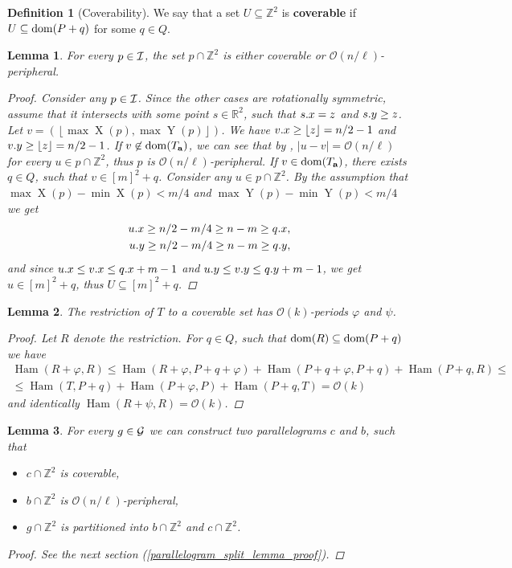 \documentclass[11pt, letterpaper]{article}
\theoremstyle{plain}
\newtheorem{lemma}{Lemma}
\theoremstyle{definition}
\newtheorem{definition}{Definition}
\theoremstyle{remark}
\newcommand{\R}{\mathbb{R}}
\newcommand{\Z}{\mathbb{Z}}
\renewcommand{\O}{\mathcal{O}}
\renewcommand{\phi}{\varphi}
\newcommand{\floor}[1]{\left\lfloor #1 \right\rfloor}
\newcommand{\eq}[1]{\begin{align*} #1 \end{align*}}
\DeclareMathOperator*{\X}{X}
\DeclareMathOperator*{\Y}{Y}
\DeclareMathOperator*{\Ham}{Ham}
\begin{document}
\begin{definition}[Coverability]
	We say that a set $U \subseteq \Z^2$ is \textbf{coverable} if $U \subseteq \operatorname*{dom}(P + q)$ for some $q \in Q$.
\end{definition}

\begin{lemma}\label{I_division}
	For every $p \in \mathcal{I}$, the set $p \cap \Z^2$ is either coverable or $\O(n / \ell)$-peripheral.
	\begin{proof}
		Consider any $p \in \mathcal{I}$.
		Since the other cases are rotationally symmetric, assume that it intersects with some point $s \in \R^2$, such that $s.x = z$ and $s.y \ge z$.
		Let $v = (\floor{\max \X(p), \max \Y(p)})$.
		We have $\x{v} \ge \floor{z} = n / 2 - 1$ and $\y{v} \ge \floor{z} = n / 2 - 1$.
		If $v \not \in \operatorname*{dom}(T_\mathbf{a})$, we can see that by ,
		$|u - v| = \O(n / \ell)$ for every $u \in p \cap \Z^2$, thus $p$ is $\O(n / \ell)$-peripheral.
		If $v \in \operatorname*{dom}(T_\mathbf{a})$, there exists $q \in Q$, such that $v \in [m]^2 + q$.
		Consider any $u \in p \cap \Z^2$.
		By the assumption that $\max \X(p) - \min \X(p) < m / 4$ and $\max \Y(p) - \min \Y(p) < m / 4$ we get
		\eq{
			\x{u} \ge n / 2 - m / 4 \ge n - m \ge \x{q},\\ 
			\y{u} \ge n / 2 - m / 4 \ge n - m \ge \y{q},
		}
		and since $u.x \le v.x \le q.x + m - 1$ and $u.y \le v.y \le q.y + m - 1$, we get $u \in [m]^2 + q$, thus $U \subseteq [m]^2 + q$.
	\end{proof}
\end{lemma}

\begin{lemma}\label{coverable is periodic}
	The restriction of $T$ to a coverable set has $\O(k)$-periods $\phi$ and $\psi$.
	\begin{proof}
		Let $R$ denote the restriction. For $q \in Q$, such that $\operatorname*{dom}(R) \subseteq \operatorname*{dom}(P + q)$ we have
		\eq{
			\Ham(R + \phi, R) \le \Ham(R + \phi, P + q + \phi) + \Ham(P + q + \phi, P + q) + \Ham(P + q, R) \le \\
			\le \Ham(T, P + q) + \Ham(P + \phi, P) + \Ham(P + q, T) = \O(k)
		}
		and identically $\Ham(R + \psi, R) = \O(k)$.
	\end{proof}
\end{lemma}

\begin{lemma}\label{parallelogram_split_lemma}
	For every $g \in \mathcal{G}$ we can construct two parallelograms $c$ and $b$, such that
	\begin{itemize}
		\item $c \cap \Z^2$ is coverable,
		\item $b \cap \Z^2$ is $\O(n / \ell)$-peripheral,
		\item $g \cap \Z^2$ is partitioned into $b \cap \Z^2$ and $c \cap \Z^2$.
	\end{itemize}
	\begin{proof} See the next section (\ref{parallelogram_split_lemma_proof}). \end{proof}
\end{lemma}
\end{document}
